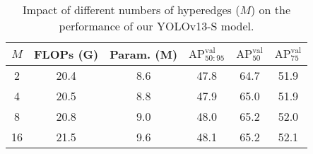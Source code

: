 \begin{table}[!tp]
\centering
\setlength{\tabcolsep}{2.6mm}
\caption{Impact of different numbers of hyperedges ($M$) on the performance of our YOLOv13-S model.}
\vspace{-0.1cm}
\label{tab:num_edge}
\renewcommand{\arraystretch}{1.0}
\begin{tabular}{cccccc}
\toprule
$M$ & \textbf{FLOPs (G)} & \textbf{Param. (M)} & \textbf{$\text{AP}_{50:95}^\text{val}$} & \textbf{$\text{AP}_{50}^\text{val}$} & \textbf{$\text{AP}_{75}^\text{val}$} \\
\midrule

2  & 20.4 & 8.6 & 47.8 & 64.7 & 51.9 \\
4  & 20.5& 8.8& 47.9& 65.0& 51.9\\
8  & 20.8 & 9.0 & 48.0 & 65.2 & 52.0 \\
16 & 21.5  & 9.6 &  48.1  & 65.2     &  52.1      \\
\bottomrule
\end{tabular}
\vspace{-0.4cm}
\end{table}
